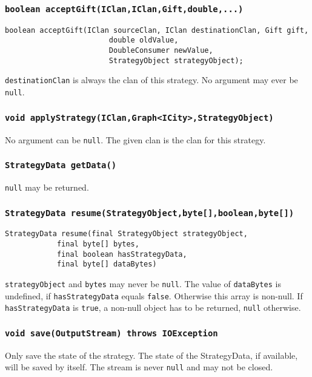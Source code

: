 \documentclass{article}
\begin{document}
\subsubsection{\texttt{boolean acceptGift(IClan,IClan,Gift,double,...)}}
\begin{verbatim}
boolean acceptGift(IClan sourceClan, IClan destinationClan, Gift gift,
                        double oldValue,
                        DoubleConsumer newValue,
                        StrategyObject strategyObject);
\end{verbatim}
\texttt{destinationClan} is always the clan of this strategy. No argument may ever be \texttt{null}.

\subsubsection{\texttt{void applyStrategy(IClan,Graph<ICity>,StrategyObject)}}
No argument can be \texttt{null}. The given clan is the clan for this strategy.

\subsubsection{\texttt{StrategyData getData()}}
\texttt{null} may be returned.

\subsubsection{\texttt{StrategyData resume(StrategyObject,byte[],boolean,byte[])}}
\begin{verbatim}
StrategyData resume(final StrategyObject strategyObject,
			final byte[] bytes,
			final boolean hasStrategyData,
			final byte[] dataBytes)
\end{verbatim}
\texttt{strategyObject} and \texttt{bytes} may never be \texttt{null}.
The value of \texttt{dataBytes} is undefined, if \texttt{hasStrategyData} equals \texttt{false}.
Otherwise this array is non-null.
If \texttt{hasStrategyData} is \texttt{true}, a non-null object has to be returned, \texttt{null} otherwise.

\subsubsection{\texttt{void save(OutputStream) throws IOException}}
Only save the state of the strategy. The state of the StrategyData, if available, will be saved by itself.
The stream is never \texttt{null} and may not be closed.
\end{document}
